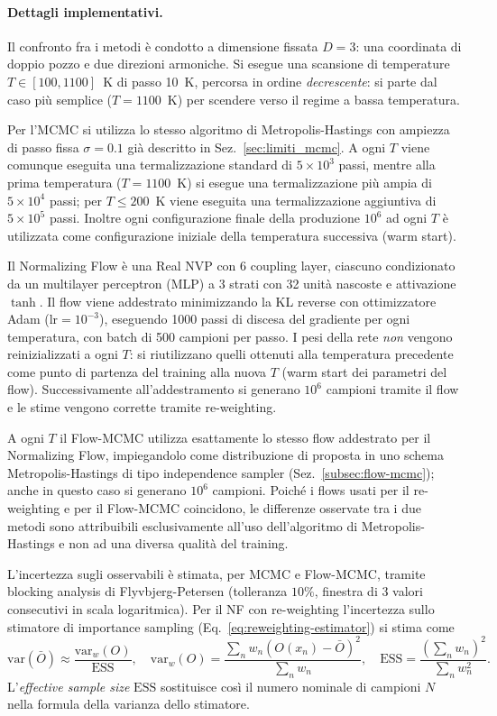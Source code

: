 \paragraph*{Dettagli implementativi.}
Il confronto fra i metodi è condotto a dimensione fissata $D=3$: una coordinata di doppio pozzo e due direzioni armoniche. Si esegue una scansione di temperature $T\in[100,1100]$~K di passo 10~K, percorsa in ordine \emph{decrescente}: si parte dal caso più semplice ($T=1100$~K) per scendere verso il regime a bassa temperatura.

Per l'MCMC si utilizza lo stesso algoritmo di Metropolis-Hastings con ampiezza di passo fissa $\sigma=0.1$ già descritto in
Sez.~\ref{sec:limiti_mcmc}. A ogni $T$ viene comunque eseguita una termalizzazione standard di $5\times 10^3$ passi, mentre alla prima temperatura ($T=1100$~K) si esegue una termalizzazione più ampia di $5\times10^4$ passi; per $T\le 200$~K viene eseguita una termalizzazione aggiuntiva di $5\times10^5$ passi. Inoltre ogni configurazione finale della produzione $10^6$ ad ogni $T$ è utilizzata come configurazione iniziale della temperatura successiva (warm start).

Il Normalizing Flow è una Real NVP con 6 coupling layer, ciascuno condizionato da un multilayer perceptron (MLP) a 3 strati con 32 unità nascoste e attivazione $\tanh$. Il flow viene addestrato minimizzando la KL reverse con ottimizzatore Adam ($\text{lr}=10^{-3}$), eseguendo 1000 passi di discesa del gradiente per ogni temperatura, con batch di 500 campioni per passo. I pesi della rete \emph{non} vengono reinizializzati a ogni $T$: si riutilizzano quelli ottenuti alla temperatura precedente come punto di partenza del training alla nuova $T$ (warm start dei parametri del flow). Successivamente all'addestramento si generano $10^6$ campioni tramite il flow e le stime vengono corrette tramite re-weighting.

A ogni $T$ il Flow-MCMC utilizza esattamente lo stesso flow addestrato per il Normalizing Flow, impiegandolo come distribuzione di proposta in uno schema Metropolis-Hastings di tipo independence sampler (Sez.~\ref{subsec:flow-mcmc}); anche in questo caso si generano $10^6$ campioni. Poiché i flows usati per il re-weighting e per il Flow-MCMC coincidono, le differenze osservate tra i due metodi sono attribuibili esclusivamente all'uso dell'algoritmo di Metropolis-Hastings e non ad una diversa qualità del training.

L'incertezza sugli osservabili è stimata, per MCMC e Flow-MCMC, tramite blocking analysis di Flyvbjerg-Petersen (tolleranza $10\%$, finestra di 3 valori consecutivi in scala logaritmica). Per il NF con re-weighting l'incertezza sullo stimatore di importance sampling (Eq.~\ref{eq:reweighting-estimator}) si stima come
\begin{equation}
    \mathrm{var}(\bar O) \approx \frac{\mathrm{var}_{w}(O)}{\mathrm{ESS}}, \quad
    \mathrm{var}_{w}(O) =  \frac{ \sum_n w_n \left(O(x_n) - \bar O\right)^2}{ \sum_n w_n}, \quad
    \mathrm{ESS} = \frac{ (\sum_n w_n)^2 }{\sum_n {w}_n^2}.
    \label{eq:var_ESS}
\end{equation}
L'\emph{effective sample size} $\mathrm{ESS}$ sostituisce così il numero nominale di campioni $N$ nella formula della varianza dello stimatore.

